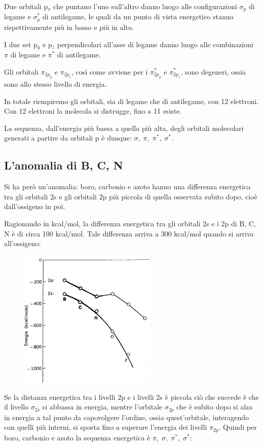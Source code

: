 Due orbitali p$_x$ che puntano l'uno sull'altro danno luogo alle configurazioni $\sigma_p$ di legame e $\sigma^*_p$ di antilegame, le quali da un punto di vista energetico stanno rispettivamente più in basso e più in alto.

I due set p$_y$ e p$_z$ perpendicolari all'asse di legame danno luogo alle combinazioni $\pi$ di legame e $\pi^*$ di antilegame.

Gli orbitali $\pi_{2p_y}$ e $\pi_{2p_z}$, così come avviene per i $\pi_{2p_y}^*$ e $\pi_{2p_z}^*$, sono degeneri, ossia sono allo stesso livello di energia.

In totale riempiremo gli orbitali, sia di legame che di antilegame, con 12 elettroni. Con 12 elettroni la molecola si distrugge, fino a 11 esiste.

La sequenza, dall'energia più bassa a quella più alta, degli orbitali molecolari generati a partire da orbitali p è dunque: $\sigma, \; \pi, \; \pi^*, \; \sigma^*$.
\subsection{L'anomalia di B, C, N}
Si ha però un'anomalia: boro, carbonio e azoto hanno una differenza energetica tra gli orbitali 2s e gli orbitali 2p più piccola di quella osservata subito dopo, cioè dall'ossigeno in poi.

Ragionando in kcal/mol, la differenza energetica tra gli orbitali 2s e i 2p di B, C, N è di circa 100 kcal/mol. Tale differenza arriva a 300 kcal/mol quando si arriva all'ossigeno:
\newpage
\begin{figure}[htp]
    \centering
    \includegraphics[width=6.5cm]{immagini/differenza_energia_2s_2p.png}
\end{figure}

Se la distanza energetica tra i livelli 2p e i livelli 2s è piccola ciò che succede è che il livello $\sigma_{2s}$ si abbassa in energia, mentre l'orbitale $\sigma_{2p}$ che è subito dopo si alza in energia a tal punto da capovolgere l'ordine, ossia quest'orbitale, interagendo con quelli più interni, si sposta fino a superare l'energia dei livelli $\pi_{2p}$. Quindi per boro, carbonio e azoto la sequenza energetica è $\pi,\; \sigma, \; \pi^*, \; \sigma^*$:

